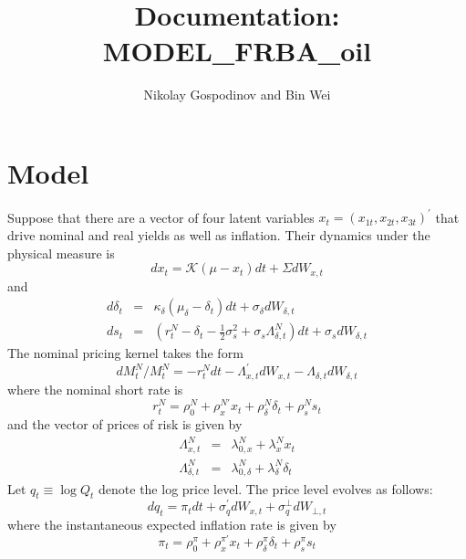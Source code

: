 \documentclass{article}
\begin{document}
\title{Documentation: MODEL\_FRBA\_oil}
\author{Nikolay Gospodinov and Bin Wei}
\maketitle

\section{Model}

Suppose that there are a vector of four latent variables $x_{t}=\left(
x_{1t},x_{2t},x_{3t}\right) ^{\prime }$ that drive nominal and real yields
as well as inflation. Their dynamics under the physical measure is%
\begin{equation}
dx_{t}=\mathcal{K}\left( \mu -x_{t}\right) dt+\Sigma dW_{x,t}
\end{equation}%
and%
\begin{eqnarray}
d\delta _{t} &=&\kappa _{\delta }\left( \mu _{\delta }-\delta _{t}\right)
dt+\sigma _{\delta }dW_{\delta ,t} \\
ds_{t} &=&\left( r_{t}^{N}-\delta _{t}-\frac{1}{2}\sigma _{s}^{2}+\sigma
_{s}\Lambda _{\delta ,t}^{N}\right) dt+\sigma _{s}dW_{\delta ,t}
\end{eqnarray}%
The nominal pricing kernel takes the form%
\begin{equation}
dM_{t}^{N}/M_{t}^{N}=-r_{t}^{N}dt-\Lambda _{x,t}^{\prime }dW_{x,t}-\Lambda
_{\delta ,t}dW_{\delta ,t}
\end{equation}%
where the nominal short rate is%
\begin{equation}
r_{t}^{N}=\rho _{0}^{N}+\rho _{x}^{N\prime }x_{t}+\rho _{\delta }^{N}\delta
_{t}+\rho _{s}^{N}s_{t}
\end{equation}%
and the vector of prices of risk is given by%
\begin{eqnarray}
\Lambda _{x,t}^{N} &=&\lambda _{0,x}^{N}+\lambda _{x}^{N}x_{t} \\
\Lambda _{\delta ,t}^{N} &=&\lambda _{0,\delta }^{N}+\lambda _{\delta
}^{N}\delta _{t}
\end{eqnarray}%
Let $q_{t}\equiv \log Q_{t}$ denote the log price level. The price level
evolves as follows: 
\begin{equation}
dq_{t}=\pi _{t}dt+\sigma _{q}^{\prime }dW_{x,t}+\sigma _{q}^{\bot }dW_{\bot
,t}
\end{equation}%
where the instantaneous expected inflation rate is given by 
\begin{equation}
\pi _{t}=\rho _{0}^{\pi }+\rho _{x}^{\pi \prime }x_{t}+\rho _{\delta }^{\pi
}\delta _{t}+\rho _{s}^{\pi }s_{t}
\end{equation}
\end{document}
